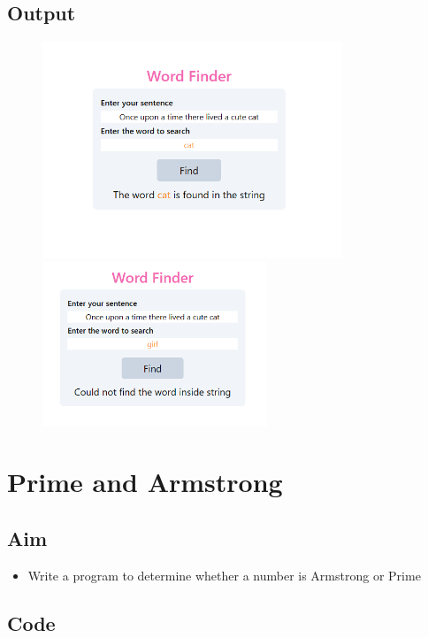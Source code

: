\documentclass{article}
\begin{document}
\subsection{Output}
\begin{figure}[h!]
	\centering
	\includegraphics[width=0.8\textwidth]{./Assets/p0801.png}
	\includegraphics[width=0.6\textwidth]{./Assets/p0802.png}
\end{figure}
\newpage

\section{Prime and Armstrong}
\subsection{Aim}
\begin{itemize}
	\item Write a program to determine whether a number is Armstrong or Prime
\end{itemize}

\subsection{Code}
\inputminted[frame=lines, breaklines, breakanywhere, numberblanklines=false]{html}{./prog_9/index.html}
\end{document}
